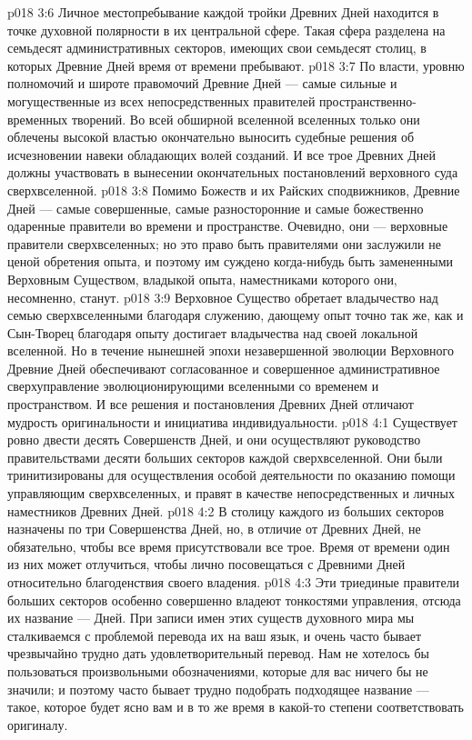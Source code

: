 \vs p018 3:6 Личное местопребывание каждой тройки Древних Дней находится в точке духовной полярности в их центральной сфере. Такая сфера разделена на семьдесят административных секторов, имеющих свои семьдесят столиц, в которых Древние Дней время от времени пребывают.
\vs p018 3:7 По власти, уровню полномочий и широте правомочий Древние Дней --- самые сильные и могущественные из всех непосредственных правителей пространственно\hyp{}временных творений. Во всей обширной вселенной вселенных только они облечены высокой властью окончательно выносить судебные решения об исчезновении навеки обладающих волей созданий. И все трое Древних Дней должны участвовать в вынесении окончательных постановлений верховного суда сверхвселенной.
\vs p018 3:8 \pc Помимо Божеств и их Райских сподвижников, Древние Дней --- самые совершенные, самые разносторонние и самые божественно одаренные правители во времени и пространстве. Очевидно, они --- верховные правители сверхвселенных; но это право быть правителями они заслужили не ценой обретения опыта, и поэтому им суждено когда\hyp{}нибудь быть замененными Верховным Существом, владыкой опыта, наместниками которого они, несомненно, станут.
\vs p018 3:9 Верховное Существо обретает владычество над семью сверхвселенными благодаря служению, дающему опыт точно так же, как и Сын\hyp{}Творец благодаря опыту достигает владычества над своей локальной вселенной. Но в течение нынешней эпохи незавершенной эволюции Верховного Древние Дней обеспечивают согласованное и совершенное административное сверхуправление эволюционирующими вселенными со временем и пространством. И все решения и постановления Древних Дней отличают мудрость оригинальности и инициатива индивидуальности.
\vs p018 4:1 Существует ровно двести десять Совершенств Дней, и они осуществляют руководство правительствами десяти больших секторов каждой сверхвселенной. Они были тринитизированы для осуществления особой деятельности по оказанию помощи управляющим сверхвселенных, и правят в качестве непосредственных и личных наместников Древних Дней.
\vs p018 4:2 В столицу каждого из больших секторов назначены по три Совершенства Дней, но, в отличие от Древних Дней, не обязательно, чтобы все время присутствовали все трое. Время от времени один из них может отлучиться, чтобы лично посовещаться с Древними Дней относительно благоденствия своего владения.
\vs p018 4:3 \pc Эти триединые правители больших секторов особенно совершенно владеют тонкостями управления, отсюда их название ---  Дней. При записи имен этих существ духовного мира мы сталкиваемся с проблемой перевода их на ваш язык, и очень часто бывает чрезвычайно трудно дать удовлетворительный перевод. Нам не хотелось бы пользоваться произвольными обозначениями, которые для вас ничего бы не значили; и поэтому часто бывает трудно подобрать подходящее название --- такое, которое будет ясно вам и в то же время в какой\hyp{}то степени соответствовать оригиналу.
